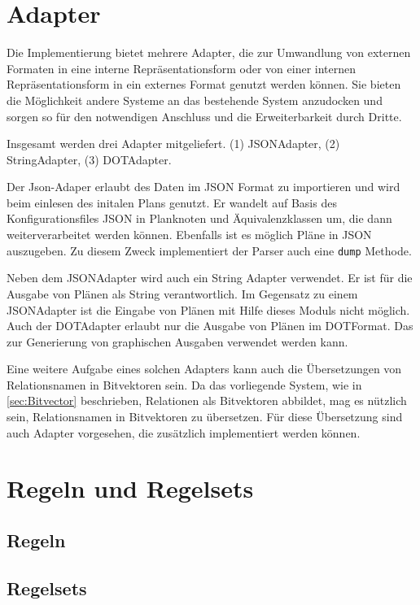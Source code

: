 \section{Adapter}

Die Implementierung bietet mehrere Adapter, die zur Umwandlung von externen Formaten in eine interne Repräsentationsform oder von einer internen Repräsentationsform in ein externes Format genutzt werden können. Sie bieten die Möglichkeit andere Systeme an das bestehende System anzudocken und sorgen so für den notwendigen Anschluss und die Erweiterbarkeit durch Dritte.

Insgesamt werden drei Adapter mitgeliefert. (1) JSON\-Adapter, (2) String\-Adapter, (3) DOT\-Adapter.

Der Json-Adaper erlaubt des Daten im JSON Format zu importieren und wird beim einlesen des initalen Plans genutzt. Er wandelt auf Basis des Konfigurationsfiles JSON in Planknoten und Äquivalenzklassen um, die dann weiterverarbeitet werden können. Ebenfalls ist es möglich Pläne in JSON auszugeben. Zu diesem Zweck implementiert der Parser auch eine \texttt{dump} Methode.

Neben dem JSON\-Adapter wird auch ein String Adapter verwendet. Er ist für die Ausgabe von Plänen als String verantwortlich. Im Gegensatz zu einem JSON\-Adapter ist die Eingabe von Plänen mit Hilfe dieses Moduls nicht möglich. Auch der DOT\-Adapter erlaubt nur die Ausgabe von Plänen im DOT\-Format. Das zur Generierung von graphischen Ausgaben verwendet werden kann.

Eine weitere Aufgabe eines solchen Adapters kann auch die Übersetzungen von Relationsnamen in Bitvektoren sein. Da das vorliegende System, wie in \ref{sec:Bitvector} beschrieben, Relationen als Bitvektoren abbildet, mag es nützlich sein, Relationsnamen in Bitvektoren zu übersetzen. Für diese Übersetzung sind auch Adapter vorgesehen, die zusätzlich implementiert werden können.




\section{Regeln und Regelsets}

\subsection{Regeln}

\subsection{Regelsets}



